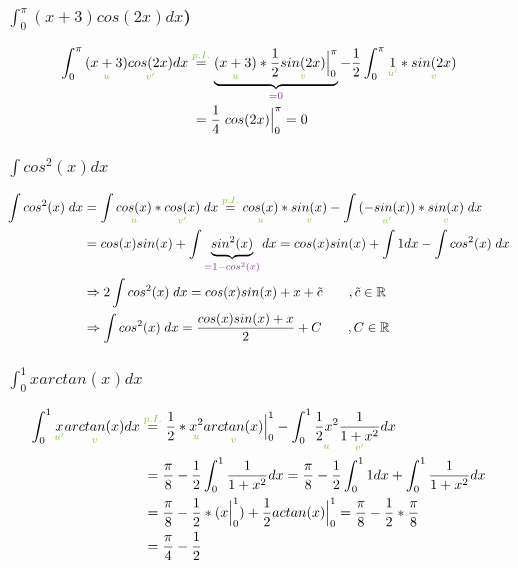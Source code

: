 \documentclass[12pt,a4paper]{article}%
\numberwithin{equation}{section}
\newcommand{\R}{\mathbb{R}} %
\def\colBord#1{\begingroup\color{Fuchsia}{#1}\endgroup}
\def\colGreen#1{\begingroup\color{LimeGreen}{#1}\endgroup}
\def\usGreen#1#2{\underset{\colGreen{#1}}{#2}}
\begin{document}
\subsubsection{$\int_0^{\pi}(x+3)cos(2x) dx$)}
\begin{align}
\int_0^{\pi} \usGreen{u}{(x+3)} \usGreen{v'}{cos(2x)}dx 
&\overset{\colGreen{p.I.}}{=} \underbrace{\usGreen{u}{(x+3)} * \frac{1}{2}\usGreen{v}{sin(2x)}\Big|_0^{\pi}}_{\colBord{=0}}
- \frac{1}{2} \int_0^{\pi} \usGreen{u'}{1} * \usGreen{v}{sin(2x)} \nonumber \\
&\;=\frac{1}{4}\; cos(2x)\Big|_0^{\pi} = 0 \label{eq:ex2}
\end{align}

\subsubsection{$\int cos^2(x)dx$}
\begin{align}
\int cos^2(x)\;dx &= \int \usGreen{u}{cos(x)} * \usGreen{v'}{cos(x)}\;dx \overset{\colGreen{p.I.}}{=}
\usGreen{u}{cos(x)} * \usGreen{v}{sin(x)} - \int \usGreen{u'}{(-sin(x))}*\usGreen{v}{sin(x)}\;dx \nonumber\\
&=cos(x)sin(x) + \int \underbrace{sin^2(x)}_{\colBord{= 1-cos^2(x)}}dx = cos(x)sin(x) + \int 1dx - \int cos^2(x)\; dx \nonumber\\
&\Rightarrow 2\int cos^2(x)\;dx = cos(x)sin(x) + x + \tilde{c} \qquad ,\tilde{c}\in\R\nonumber\\
&\Rightarrow \int cos^2(x)\;dx = \frac{cos(x)sin(x)+x}{2}+C \qquad, C\in\R \label{eq:ex3}
\end{align}

\subsubsection{$\int_0^1 x arctan(x) dx$}
\begin{align}
\int_0^1 \usGreen{u'}{x} \usGreen{v}{arctan(x)} dx &\overset{\colGreen{p.I.}}{=} 
\frac{1}{2} * \usGreen{u}{x^2} \usGreen{v}{arctan(x)} \Big|_0^1 - 
\int_0^1 \usGreen{u}{\frac{1}{2} x^2} \usGreen{v'}{\frac{1}{1+x^2}}dx \nonumber\\
&\;= \frac{\pi}{8} - \frac{1}{2} \int_0^1 \frac{1}{1+x^2} dx 
= \frac{\pi}{8} - \frac{1}{2} \int_0^1 1 dx + \int_0^1 \frac{1}{1+x^2} dx \nonumber\\
&\;= \frac{\pi}{8} - \frac{1}{2}* (x\Big|_0^1) + \frac{1}{2} actan(x)\Big|_0^1 
= \frac{\pi}{8} - \frac{1}{2} * \frac{\pi}{8} \nonumber\\
&\;= \frac{\pi}{4} - \frac{1}{2} \label{eq:ex4}
\end{align}
\end{document}
